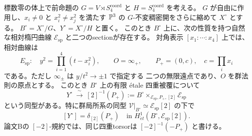 \begin{theorem}
\label{thm:qa-ou-spectral-kummer}
標数零の体上で前命題の $G=V\rtimes S_4^{\mathrm{coord}}$ と
$H=S_4^{\mathrm{coord}}$ を考える。
$G$ が自由に作用し、$x_i\ne0$ と $x_i^2\ne x_j^2$ を満たす
$\mathbb P^3$ の $G$-不変稠密開をさらに縮めて $X^\circ$ とする。
$B^\circ=X^\circ/G$、$Y^\circ=X^\circ/H$ と置く。
このとき $B^\circ$ 上に、次の性質を持つ自然な相対楕円曲線
$\mathcal E_{\mathrm{sp}}$ と二つのsectionが存在する。
対角表示 $[x_1:\cdots:x_4]$ 上では、相対曲線は
\[
 E_{\mathrm{sp}}:\quad
 y^2=\prod_{i=1}^{4}(t-x_i^2),\qquad
 O=\infty_+,\qquad P_+=(0,c),\quad c=\prod_i x_i
 \tag{OU-sp}\label{eq:qa-ou-spectral-elliptic}
\]
である。ただし $\infty_\pm$ は $y/t^2\to\pm1$ で指定する
二つの無限遠点であり、$O$ を群法則の原点とする。
このとき $B^\circ$ 上の有限 étale 四重被覆について
\[
 Y^\circ \ \xrightarrow{\ \sim\ }\
 [2]^{-1}(P_+)
 :=B^\circ\times_{\mathcal E_{\mathrm{sp}},P_+,[2]}
                \mathcal E_{\mathrm{sp}}
 \tag{OU-Kum}\label{eq:qa-ou-spectral-kummer}
\]
という同型がある。特に群局所系の同型
$\mathcal V|_{B^\circ}\simeq\mathcal E_{\mathrm{sp}}[2]$ の下で
\[
 [Y^\circ]=\delta_{[2]}(P_+)
 \quad\text{in }H^1_{\acute et}
                  (B^\circ,\mathcal E_{\mathrm{sp}}[2]).
 \tag{OU-Kum-class}\label{eq:qa-ou-spectral-kummer-class}
\]
論文Bの $[-2]$-規約では、同じ四重torsorは
$[-2]^{-1}(-P_+)$ と書ける。
\end{theorem}
